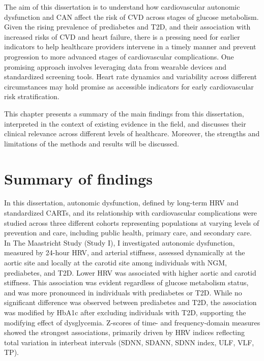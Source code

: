\documentclass[
  a4paper,
  headsepline=true,
  open=any]{scrbook}
\begin{document}
The aim of this dissertation is to understand how cardiovascular
autonomic dysfunction and CAN affect the risk of CVD across stages of
glucose metabolism. Given the rising prevalence of prediabetes and T2D,
and their association with increased risks of CVD and heart failure,
there is a pressing need for earlier indicators to help healthcare
providers intervene in a timely manner and prevent progression to more
advanced stages of cardiovascular complications. One promising approach
involves leveraging data from wearable devices and standardized
screening tools. Heart rate dynamics and variability across different
circumstances may hold promise as accessible indicators for early
cardiovascular risk stratification.

This chapter presents a summary of the main findings from this
dissertation, interpreted in the context of existing evidence in the
field, and discusses their clinical relevance across different levels of
healthcare. Moreover, the strengths and limitations of the methods and
results will be discussed.

\newpage

\hypertarget{summary-of-findings}{%
\section{Summary of findings}\label{summary-of-findings}}

In this dissertation, autonomic dysfunction, defined by long-term HRV
and standardized CARTs, and its relationship with cardiovascular
complications were studied across three different cohorts representing
populations at varying levels of prevention and care, including public
health, primary care, and secondary care. In The Maastricht Study (Study
I), I investigated autonomic dysfunction, measured by 24-hour HRV, and
arterial stiffness, assessed dynamically at the aortic site and locally
at the carotid site among individuals with NGM, prediabetes, and T2D.
Lower HRV was associated with higher aortic and carotid stiffness. This
association was evident regardless of glucose metabolism status, and was
more pronounced in individuals with prediabetes or T2D. While no
significant difference was observed between prediabetes and T2D, the
association was modified by HbA1c after excluding individuals with T2D,
supporting the modifying effect of dysglycemia. Z-scores of time- and
frequency-domain measures showed the strongest associations, primarily
driven by HRV indices reflecting total variation in interbeat intervals
(SDNN, SDANN, SDNN index, ULF, VLF, TP).
\end{document}
